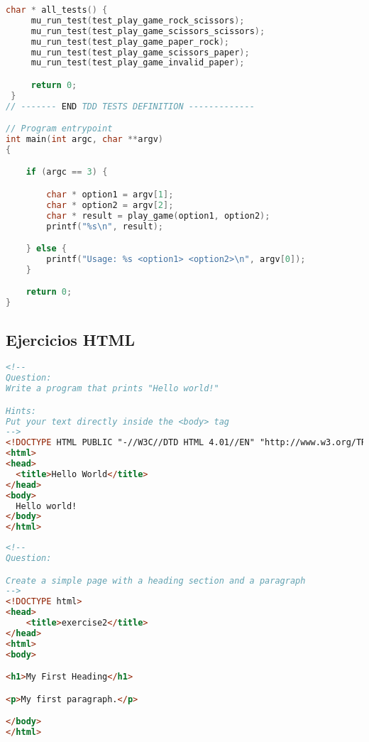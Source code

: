 \begin{lstlisting}[language=c,caption={exercise\_5.c},captionpos=b]
char * all_tests() {
     mu_run_test(test_play_game_rock_scissors);
     mu_run_test(test_play_game_scissors_scissors);
     mu_run_test(test_play_game_paper_rock);
     mu_run_test(test_play_game_scissors_paper);
     mu_run_test(test_play_game_invalid_paper);

     return 0;
 }
// ------- END TDD TESTS DEFINITION -------------

// Program entrypoint
int main(int argc, char **argv)
{

    if (argc == 3) {

        char * option1 = argv[1];
        char * option2 = argv[2];
        char * result = play_game(option1, option2);
        printf("%s\n", result);

    } else {
        printf("Usage: %s <option1> <option2>\n", argv[0]);
    }

    return 0;
}
\end{lstlisting}

\subsection{Ejercicios HTML}

\begin{lstlisting}[language=html,caption={exercise\_1.html},captionpos=b]
<!--
Question:
Write a program that prints "Hello world!"

Hints:
Put your text directly inside the <body> tag
-->
<!DOCTYPE HTML PUBLIC "-//W3C//DTD HTML 4.01//EN" "http://www.w3.org/TR/html4/strict.dtd">
<html>
<head>
  <title>Hello World</title>
</head>
<body>
  Hello world!
</body>
</html>
\end{lstlisting}

\begin{lstlisting}[language=html,caption={exercise\_2.html},captionpos=b]
<!--
Question:

Create a simple page with a heading section and a paragraph
-->
<!DOCTYPE html>
<head>
    <title>exercise2</title>
</head>
<html>
<body>

<h1>My First Heading</h1>

<p>My first paragraph.</p>

</body>
</html>
\end{lstlisting}

